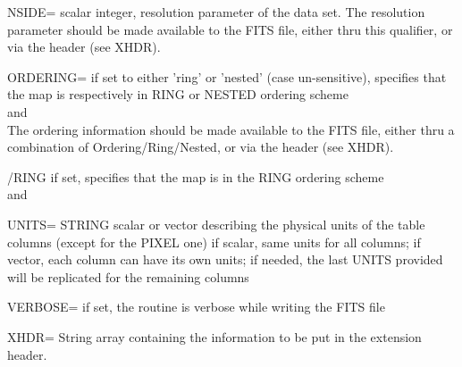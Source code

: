 \begin{keywords}
\begin{kwlist}{}
	\item[{NSIDE=}]  
		scalar integer, \healpix resolution parameter of the
		data set. The resolution parameter should be made
		available to the FITS file, either thru this
		qualifier, or via the header (see XHDR).

	\item[{ORDERING=}] 
		if set to either 'ring' or 'nested' (case un-sensitive),
		  specifies that the map is respectively in RING or NESTED
		  ordering scheme\\
		\seealso {} 
		and  \\
	The ordering information should be made
		available to the FITS file, either thru a combination
		  of Ordering/Ring/Nested, or via the header (see XHDR).


	\item[{/RING}]   
	if set, specifies that the map is in the RING ordering
	scheme\\
	\seealso {} 
	and 

	\item[{UNITS=}] 
		STRING scalar or vector describing the physical units of the table columns 
	(except for the PIXEL one)
		if scalar, same units for all columns;
	if vector, each column can have its own units; if needed, 
	the last UNITS provided will be replicated for the remaining columns

	\item[{VERBOSE=}] 
		if set, the routine is verbose while writing the FITS file

    	\item[XHDR=] %
		String array containing the information to be put in
		the extension header. 


   \end{kwlist}
\end{keywords}

